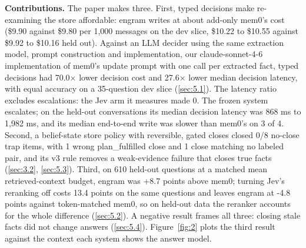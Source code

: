 \documentclass[11pt]{article}
\newcommand{\src}[1]{}
\begin{document}
\textbf{Contributions.} The paper makes three. First, typed decisions make re-examining the store affordable: engram writes at about add-only mem0's cost (\$9.90\src{bench/results/e2\_jev\_\_dev.json} against \$9.80\src{bench/results/mem0\_\_dev.json} per 1,000 messages on the dev slice, \$10.22\src{bench/results/heldout\_report.json} to \$10.55\src{bench/results/heldout\_report.json} against \$9.92\src{bench/results/heldout\_report.json} to \$10.16\src{bench/results/heldout\_report.json} held out). Against an LLM decider using the same extraction model, prompt construction and implementation, our claude-sonnet-4-6 implementation of mem0's update prompt with one call per extracted fact, typed decisions had 70.0$\times$\src{bench/results/e2\_llm\_\_dev.json ÷ bench/results/e2\_jev\_\_dev.json} lower decision cost and 27.6$\times$\src{bench/results/e2\_llm\_\_dev.json ÷ bench/results/e2\_jev\_\_dev.json} lower median decision latency, with equal accuracy on a 35\src{bench/results/e2\_jev\_\_dev.json}-question dev slice (\cref{sec:5.1}). The latency ratio excludes escalations: the Jev arm it measures made 0\src{bench/results/e2\_jev\_\_dev.json}. The frozen system escalates; on the held-out conversations its median decision latency was 868 ms\src{bench/results/heldout\_report.json} to 1,982 ms\src{bench/results/heldout\_report.json}, and its median end-to-end write was slower than mem0's on 3\src{bench/results/heldout\_report.json: conversations where engram's write p50 exceeds mem0's} of 4\src{bench/results/heldout\_report.json}. Second, a belief-state store policy with reversible, gated closes closed 0/8\src{bench/results/e4\_belief\_v2\_\_dev\_updates\_\_k3.json} no-close trap items, with 1\src{bench/results/e4\_belief\_v2\_\_dev\_updates\_\_k3.json} wrong plan\_fulfilled close and 1\src{bench/results/e4\_belief\_v2\_\_dev\_updates\_\_k3.json} close matching no labeled pair, and its v3 rule removes a weak-evidence failure that closes true facts (\cref{sec:3.2}, \cref{sec:5.3}). Third, on 610\src{bench/results/heldout\_report.json} held-out questions at a matched mean retrieved-context budget, engram was +8.7\src{bench/results/mem0\_token\_matched\_\_heldout\_pooled\_\_k6.json} points above mem0; turning Jev's reranking off costs 13.4\src{bench/results/heldout\_extra.json} points on the same questions and leaves engram at -4.8\src{bench/results/heldout\_extra.json} points against token-matched mem0, so on held-out data the reranker accounts for the whole difference (\cref{sec:5.2}). A negative result frames all three: closing stale facts did not change answers (\cref{sec:5.4}). Figure~\ref{fig:2} plots the third result against the context each system shows the answer model.
\end{document}
